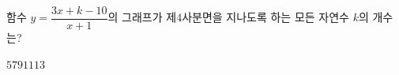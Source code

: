 \hspace*{2mm}\begin{minipage}[t]{\dimexpr\linewidth-2mm\relax}\vspace{0pt}
함수 $y=\dfrac{3x+k-10}{x+1}$의 그래프가 제$4$사분면을 지나도록 하는 모든 자연수 $k$의 개수는?
\begin{choices32}{$5$}{$7$}{$9$}{$11$}{$13$}\end{choices32}\end{minipage}
